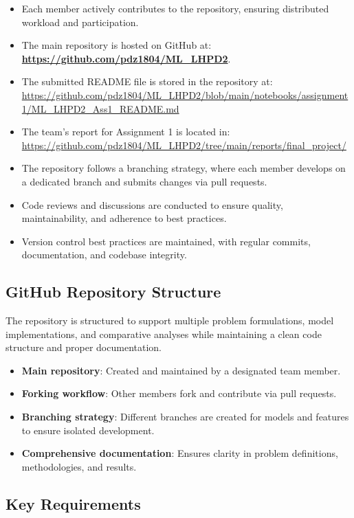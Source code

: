 \begin{itemize}
    \item Each member actively contributes to the repository, ensuring distributed workload and participation.
    \item The main repository is hosted on GitHub at:  
    \textbf{\url{https://github.com/pdz1804/ML_LHPD2}}.
    \item The submitted README file is stored in the repository at: \url{https://github.com/pdz1804/ML_LHPD2/blob/main/notebooks/assignment1/ML_LHPD2_Ass1_README.md}
    \item The team's report for Assignment 1 is located in: \url{https://github.com/pdz1804/ML_LHPD2/tree/main/reports/final_project/}
    \item The repository follows a branching strategy, where each member develops on a dedicated branch and submits changes via pull requests.
    \item Code reviews and discussions are conducted to ensure quality, maintainability, and adherence to best practices.
    \item Version control best practices are maintained, with regular commits, documentation, and codebase integrity.
\end{itemize}

\subsection{GitHub Repository Structure}

The repository is structured to support multiple problem formulations, model implementations, and comparative analyses while maintaining a clean code structure and proper documentation.

\begin{itemize}
    \item \textbf{Main repository}: Created and maintained by a designated team member.
    \item \textbf{Forking workflow}: Other members fork and contribute via pull requests.
    \item \textbf{Branching strategy}: Different branches are created for models and features to ensure isolated development.
    \item \textbf{Comprehensive documentation}: Ensures clarity in problem definitions, methodologies, and results.
\end{itemize}

\subsection{Key Requirements}

